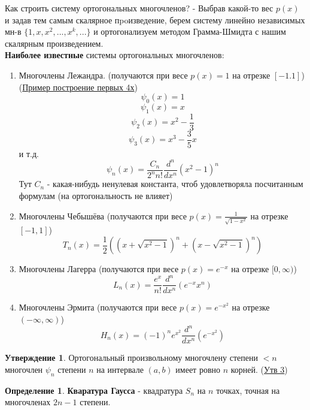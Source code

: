 \documentclass[specialist, subf, href, colorlinks=true, 12pt, times, mtpro, final]{disser}
\theoremstyle{definition}
\newtheorem{defn}{Определение}[section]
\newtheorem{state}{Утверждение}[section]
\begin{document}
    Как строить систему ортогональных многочленов? - Выбрав какой-то вес $p(x)$ и задав тем самым скалярное пpoизведение, берем систему линейно независимых мн-в $\{1,x,x^2,...,x^k,...\}$ и ортогонализуем методом Грамма-Шмидта с нашим скалярным произведением.\\
    \textbf{Наиболее известные} системы ортогональных многочленов:
    \begin{enumerate}
        \item Многочлены Лежандра. (получаются при весе $p(x) = 1$ на отрезке $[-1.1]$) (\hyperlink {lects.41}{Пример построение первых 4х})
        $$
            \psi_0(x) = 1
        $$
        $$
            \psi_1(x) = x
        $$
        $$
            \psi_2(x) = x^2 - \frac{1}{3}
        $$
        $$
            \psi_3(x) = x^3 - \frac{3}{5}x
        $$
        и т.д.
        $$
            \psi_n(x) = \frac{C_n}{2^n n!} \frac{d^n}{dx^n} (x^2 - 1)^n
        $$
        Тут $C_n$ - какая-нибудь ненулевая константа, чтоб удовлетворяла посчитанным формулам (на ортогональность не влияет)
        \item Многочлены Чебышёва (получаются при весе $p(x) = \frac{1}{\sqrt{1-x^2}}$ на отрезке $[-1, 1]$)
        $$
            T_n(x) = \frac{1}{2}\left( \left( x + \sqrt{x^2 - 1} \right)^n + \left( x - \sqrt{x^2 - 1} \right)^n \right)
        $$
        \item Многочлены Лагерра (получаются при весе $p(x) = e^{-x}$ на отрезке $[0, \infty)$)
        $$
            L_n(x) = \frac{e^x}{n!}\frac{d^n}{dx^n}(e^{-x}x^n)
        $$
        \item Многочлены Эрмита (получаются при весе $p(x) = e^{-x^2}$ на отрезке $(-\infty, \infty)$)
        $$
            H_n(x) = (-1)^n e^{x^2} \frac{d^n}{dx^n}(e^{-x^2})
        $$
    \end{enumerate}

    \begin{state}
        Ортогональный произвольному многочлену степени $<n$ многочлен $\psi_n$ степени $n$ на интервале $(a,b)$ имеет ровно $n$ корней. (\hyperlink {lects.41}{Утв 3})
    \end{state}

    \begin{defn}
        \textbf{Кваратура Гаусса} - квадратура $S_n$ на $n$ точках, точная на многочленах $2n-1$ степени.
    \end{defn}
    
\end{document}
